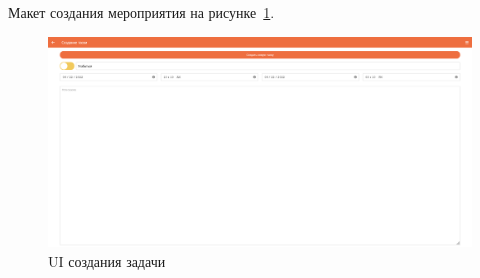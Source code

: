 Макет создания мероприятия на рисунке~\ref{fig:UiDatePage}.

\begin{figure}[!h]
  \centering
  \includegraphics[width=16cm]
  {images/screenshots/TaskPage.png}
  \caption{UI создания задачи}
  \label{fig:UiDatePage}
\end{figure}

